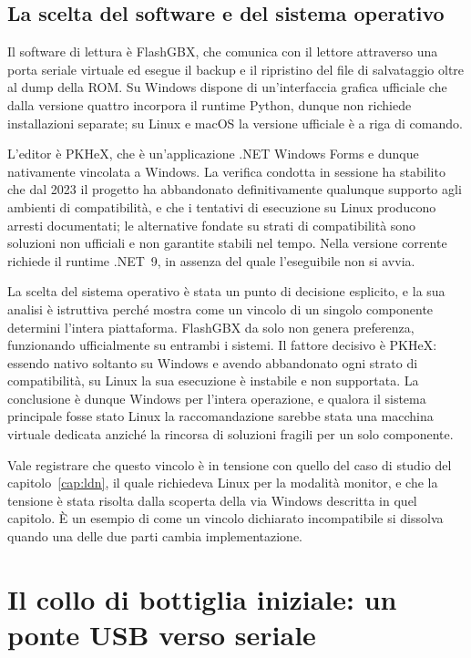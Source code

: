 \subsection{La scelta del software e del sistema operativo}

Il software di lettura è FlashGBX, che comunica con il lettore attraverso una porta seriale virtuale ed esegue il backup e il ripristino del file di salvataggio oltre al dump della ROM. Su Windows dispone di un'interfaccia grafica ufficiale che dalla versione quattro incorpora il runtime Python, dunque non richiede installazioni separate; su Linux e macOS la versione ufficiale è a riga di comando.

L'editor è PKHeX, che è un'applicazione .NET Windows Forms e dunque nativamente vincolata a Windows. La verifica condotta in sessione ha stabilito che dal 2023 il progetto ha abbandonato definitivamente qualunque supporto agli ambienti di compatibilità, e che i tentativi di esecuzione su Linux producono arresti documentati; le alternative fondate su strati di compatibilità sono soluzioni non ufficiali e non garantite stabili nel tempo. Nella versione corrente richiede il runtime .NET~9, in assenza del quale l'eseguibile non si avvia.

La scelta del sistema operativo è stata un punto di decisione esplicito, e la sua analisi è istruttiva perché mostra come un vincolo di un singolo componente determini l'intera piattaforma. FlashGBX da solo non genera preferenza, funzionando ufficialmente su entrambi i sistemi. Il fattore decisivo è PKHeX: essendo nativo soltanto su Windows e avendo abbandonato ogni strato di compatibilità, su Linux la sua esecuzione è instabile e non supportata. La conclusione è dunque Windows per l'intera operazione, e qualora il sistema principale fosse stato Linux la raccomandazione sarebbe stata una macchina virtuale dedicata anziché la rincorsa di soluzioni fragili per un solo componente.

Vale registrare che questo vincolo è in tensione con quello del caso di studio del capitolo~\ref{cap:ldn}, il quale richiedeva Linux per la modalità monitor, e che la tensione è stata risolta dalla scoperta della via Windows descritta in quel capitolo. È un esempio di come un vincolo dichiarato incompatibile si dissolva quando una delle due parti cambia implementazione.

\section{Il collo di bottiglia iniziale: un ponte USB verso seriale}

